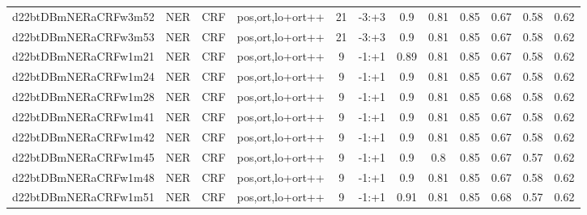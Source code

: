 \documentclass[a4paper]{article}
\begin{document}
\begin{landscape}
\begin{center}
\begin{tabular}{ |c|c|c|c|c|c|c|c|c|c|c|c|}
 
 	
 	\small{ d22btDBmNERaCRFw3m52 } & \small{ NER} & \small{  CRF }  & pos,ort,lo+ort++  &  21 &  \small{  -3:+3 }  &  0.9 & 0.81 & 0.85  &  0.67 & 0.58 & 0.62 \\
 	

 
 	
 	\small{ d22btDBmNERaCRFw3m53 } & \small{ NER} & \small{  CRF }  & pos,ort,lo+ort++  &  21 &  \small{  -3:+3 }  &  0.9 & 0.81 & 0.85  &  0.67 & 0.58 & 0.62 \\
 	

 
 	
 	\small{ d22btDBmNERaCRFw1m21 } & \small{ NER} & \small{  CRF }  & pos,ort,lo+ort++  &  9 &  \small{  -1:+1 }  &  0.89 & 0.81 & 0.85  &  0.67 & 0.58 & 0.62 \\
 	

 
 	
 	\small{ d22btDBmNERaCRFw1m24 } & \small{ NER} & \small{  CRF }  & pos,ort,lo+ort++  &  9 &  \small{  -1:+1 }  &  0.9 & 0.81 & 0.85  &  0.67 & 0.58 & 0.62 \\
 	

 
 	
 	\small{ d22btDBmNERaCRFw1m28 } & \small{ NER} & \small{  CRF }  & pos,ort,lo+ort++  &  9 &  \small{  -1:+1 }  &  0.9 & 0.81 & 0.85  &  0.68 & 0.58 & 0.62 \\
 	

 
 	
 	\small{ d22btDBmNERaCRFw1m41 } & \small{ NER} & \small{  CRF }  & pos,ort,lo+ort++  &  9 &  \small{  -1:+1 }  &  0.9 & 0.81 & 0.85  &  0.67 & 0.58 & 0.62 \\
 	

 
 	
 	\small{ d22btDBmNERaCRFw1m42 } & \small{ NER} & \small{  CRF }  & pos,ort,lo+ort++  &  9 &  \small{  -1:+1 }  &  0.9 & 0.81 & 0.85  &  0.67 & 0.58 & 0.62 \\
 	

 
 	
 	\small{ d22btDBmNERaCRFw1m45 } & \small{ NER} & \small{  CRF }  & pos,ort,lo+ort++  &  9 &  \small{  -1:+1 }  &  0.9 & 0.8 & 0.85  &  0.67 & 0.57 & 0.62 \\
 	

 
 	
 	\small{ d22btDBmNERaCRFw1m48 } & \small{ NER} & \small{  CRF }  & pos,ort,lo+ort++  &  9 &  \small{  -1:+1 }  &  0.9 & 0.81 & 0.85  &  0.67 & 0.58 & 0.62 \\
 	

 
 	
 	\small{ d22btDBmNERaCRFw1m51 } & \small{ NER} & \small{  CRF }  & pos,ort,lo+ort++  &  9 &  \small{  -1:+1 }  &  0.91 & 0.81 & 0.85  &  0.68 & 0.57 & 0.62 \\
 	


\end{tabular}
\end{center}
\end{landscape}
\end{document}
